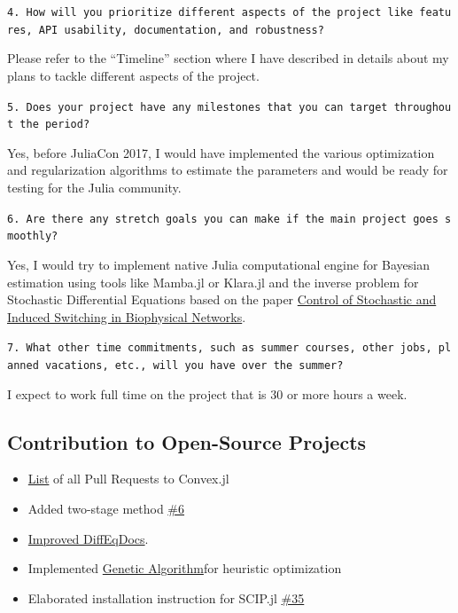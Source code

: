 \documentclass[11pt]{article}
\begin{document}
\texttt{4.\ How\ will\ you\ prioritize\ different\ aspects\ of\ the\ project\ like\ features,\ API\ usability,\ documentation,\ and\ robustness?}

Please refer to the ``Timeline'' section where I have described in
details about my plans to tackle different aspects of the project.

\texttt{5.\ Does\ your\ project\ have\ any\ milestones\ that\ you\ can\ target\ throughout\ the\ period?}

Yes, before JuliaCon 2017, I would have implemented the various
optimization and regularization algorithms to estimate the parameters
and would be ready for testing for the Julia community.

\texttt{6.\ Are\ there\ any\ stretch\ goals\ you\ can\ make\ if\ the\ main\ project\ goes\ smoothly?}

Yes, I would try to implement native Julia computational engine for
Bayesian estimation using tools like Mamba.jl or Klara.jl and the
inverse problem for Stochastic Differential Equations based on the paper
\href{http://journals.aps.org/prx/abstract/10.1103/PhysRevX.5.031036}{Control
of Stochastic and Induced Switching in Biophysical Networks}.

\texttt{7.\ What\ other\ time\ commitments,\ such\ as\ summer\ courses,\ other\ jobs,\ planned\ vacations,\ etc.,\ will\ you\ have\ over\ the\ summer?}

I expect to work full time on the project that is 30 or more hours a
week.

\subsection{Contribution to Open-Source
Projects}\label{contribution-to-open-source-projects}

\begin{itemize}
\item
  \href{https://github.com/JuliaOpt/Convex.jl/pulls?q=is:pr+author:Ayush-iitkgp+is:closed}{List}
  of all Pull Requests to Convex.jl
\item
  Added two-stage method
  \href{https://github.com/JuliaDiffEq/DiffEqParamEstim.jl/pull/6}{\#6}
\item
  \href{https://github.com/JuliaDiffEq/DiffEqDocs.jl/pulls?q=is:pr+author:Ayush-iitkgp+is:closed}{Improved
  DiffEqDocs}.
\item
  Implemented
  \href{https://github.com/Ayush-iitkgp/Heuristic-Optimization}{Genetic
  Algorithm}for heuristic optimization
\item
  Elaborated installation instruction for SCIP.jl
  \href{https://github.com/SCIP-Interfaces/SCIP.jl/pull/35}{\#35}
\end{itemize}
\end{document}
